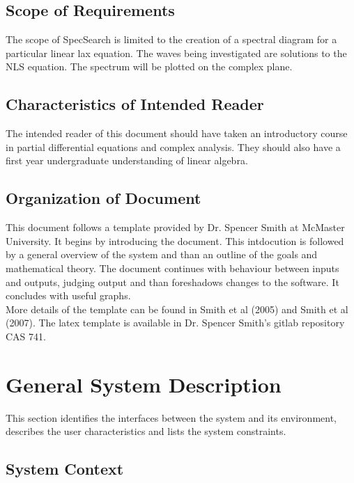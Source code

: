 \documentclass[12pt]{article}
\begin{document}
\subsection{Scope of Requirements} 

The scope of SpecSearch is limited to the creation of a spectral diagram for a 
particular linear lax equation. The waves being investigated are solutions to 
the NLS equation. The spectrum will be plotted on the complex plane. 

\subsection{Characteristics of Intended Reader} 

The intended reader of this document should have taken an introductory course 
in partial differential equations and complex analysis. They should also have a 
first year undergraduate understanding of linear algebra.\\

\subsection{Organization of Document}

This document follows a template provided by Dr. Spencer Smith at McMaster 
University. It begins by introducing the document. This intdocution is followed 
by a general overview of the system and than an outline of the goals and 
mathematical theory. The document continues with behaviour between inputs and 
outputs, judging output and than foreshadows changes to the software. It 
concludes with useful graphs. \\ 
More details of the template can be found in Smith et al (2005) and Smith et al 
(2007). The latex template is available in Dr. Spencer Smith's gitlab 
repository CAS 741. \\

\section{General System Description}

This section identifies the interfaces between the system and its environment,
describes the user characteristics and lists the system constraints.

\subsection{System Context}
\end{document}
